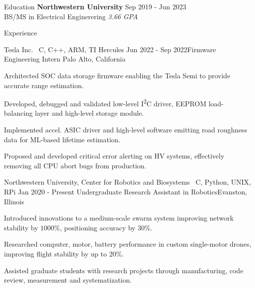\documentclass{resume}
\begin{document}
\begin{rSection}{Education}
    {\bf Northwestern University}
    \hfill {Sep 2019 - Jun 2023} \\ 
    BS/MS in Electrical Enginerering
    \hfill {\em 3.66 GPA}
\end{rSection}

\begin{rSection}{Experience}
    \begin{rSubsection}
        {Tesla Inc. \mid\ \textnormal{C, C++, ARM, TI Hercules}}
        {Jun 2022 - Sep 2022}{Firmware Engineering Intern}
        {Palo Alto, California}
        \item Architected SOC data storage firmware enabling the Tesla Semi to
            provide accurate range estimation.
        \item Developed, debugged and validated low-level I\textsuperscript{2}C
            driver, EEPROM load-balancing layer and high-level storage module.
        \item Implemented accel. ASIC driver and high-level software
            emitting road roughness data for ML-based lifetime estimation.
        \item Proposed and developed critical error alerting on HV systems,
            effectively removing all CPU abort bugs from production.
    \end{rSubsection}
    \begin{rSubsection}
        {Northwestern University, Center for Robotics and Biosystems
         \mid\ \textnormal{C, Python, UNIX, RPi}
        }
        {Jan 2020 - Present}
        {Undergraduate Research Assistant in Robotics}{Evanston, Illinois}
        \item Introduced innovations to a medium-scale swarm system improving
            network stability by $1000\%$, positioning accuracy by $30\%$.
        \item Researched computer, motor, battery performance in custom
            single-motor drones, improving flight stability by up to $20\%$.
        \item Assisted graduate students with research projects through
            manufacturing, code review, measurement and systematization.
    \end{rSubsection}
    \begin{rSubsection}

\end{rSubsection}
\end{rSection}
\end{document}
